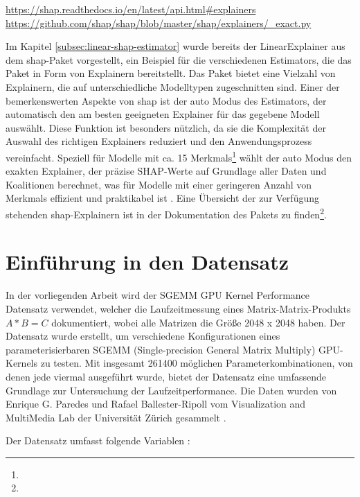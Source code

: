 \urldef{\shapurl}\url{https://shap.readthedocs.io/en/latest/api.html#explainers}
\urldef{\exacturl}\url{https://github.com/shap/shap/blob/master/shap/explainers/_exact.py}

Im Kapitel \ref{subsec:linear-shap-estimator} wurde bereits der LinearExplainer aus dem \textsf{shap}-Paket 
vorgestellt, ein Beispiel für die verschiedenen Estimators, die das Paket in Form von Explainern bereitstellt. 
Das Paket bietet eine Vielzahl von Explainern, die auf unterschiedliche Modelltypen zugeschnitten sind. 
Einer der bemerkenswerten Aspekte von \textsf{shap} ist der auto Modus des Estimators, 
der automatisch den am besten geeigneten Explainer für das gegebene Modell auswählt. 
Diese Funktion ist besonders nützlich, da sie die Komplexität der Auswahl des richtigen Explainers 
reduziert und den Anwendungsprozess vereinfacht. Speziell für Modelle mit ca. 15 Merkmals\footnote{\exacturl} wählt der 
auto Modus den exakten Explainer, der präzise SHAP-Werte auf Grundlage aller Daten und Koalitionen berechnet, was für Modelle mit einer geringeren Anzahl 
von Merkmals effizient und praktikabel ist \cite[S. 40f]{Molnar_2023}. Eine Übersicht der zur Verfügung stehenden \textsf{shap}-Explainern ist in der
Dokumentation des Pakets zu finden\footnote{\shapurl}. 


\section{Einführung in den Datensatz}

In der vorliegenden Arbeit wird der SGEMM GPU Kernel Performance Datensatz verwendet, welcher die Laufzeitmessung eines Matrix-Matrix-Produkts 
\(A*B = C\) dokumentiert, wobei alle Matrizen die Größe 2048 x 2048 haben. 
Der Datensatz wurde erstellt, um verschiedene Konfigurationen eines parameterisierbaren SGEMM 
(Single-precision General Matrix Multiply) GPU-Kernels zu testen. Mit insgesamt 261400 möglichen Parameterkombinationen, 
von denen jede viermal ausgeführt wurde, bietet der Datensatz eine umfassende Grundlage zur Untersuchung der Laufzeitperformance.
Die Daten wurden von Enrique G. Paredes und Rafael Ballester-Ripoll vom Visualization and MultiMedia Lab der Universität 
Zürich gesammelt \cite{ballesterripoll2017sobol, Nugteren_2015}. 

Der Datensatz umfasst folgende Variablen \cite{misc_sgemm_gpu_kernel_performance_440}:

